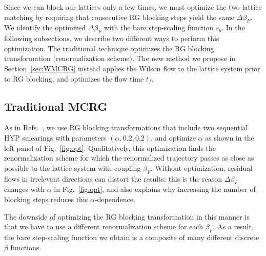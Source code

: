 \documentclass{PoS}
\newcommand{\al}{\ensuremath{\alpha} }
\newcommand{\be}{\ensuremath{\beta} }
\newcommand{\De}{\ensuremath{\Delta} }
\newcommand{\X}{\ensuremath{\!\times\!} }
\newcommand{\refcite}[1]{Ref.~\cite{#1}}
\newcommand{\fig}[1]{Fig.~\ref{#1}}
\newcommand{\secref}[1]{Section~\ref{#1}}
\begin{document}
Since we can block our lattices only a few times, we must optimize the two-lattice matching by requiring that consecutive RG blocking steps yield the same $\De\be_F$.
We identify the optimized $\De\be_F$ with the bare step-scaling function $s_b$.
In the following subsections, we describe two different ways to perform this optimization.
The traditional technique optimizes the RG blocking transformation (renormalization scheme).
The new method we propose in \secref{sec:WMCRG} instead applies the Wilson flow to the lattice system prior to RG blocking, and optimizes the flow time $t_f$.




\subsection{Traditional MCRG} %
As in Refs.~\cite{Hasenfratz:2011xn, Hasenfratz:2011np}, we use RG blocking transformations that include two sequential HYP smearings with parameters $(\al, 0.2, 0.2)$, and optimize \al as shown in the left panel of \fig{fig:opt}.
Qualitatively, this optimization finds the renormalization scheme for which the renormalized trajectory passes as close as possible to the lattice system with coupling $\be_F$.
Without optimization, residual flows in irrelevant directions can distort the results: this is the reason $\De\be_F$ changes with \al in \fig{fig:opt}, and also explains why increasing the number of blocking steps reduces this $\al$-dependence.

The downside of optimizing the RG blocking transformation in this manner is that we have to use a different renormalization scheme for each $\be_F$.
As a result, the bare step-scaling function we obtain is a composite of many different discrete \be functions.
\end{document}
